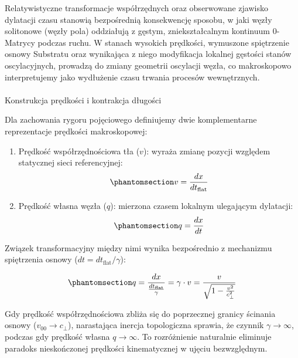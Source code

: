 \documentclass[
  polish,
  letterpaper,
  DIV=11,
  numbers=noendperiod,
  oneside]{scrartcl}
\makeatletter
\let\oldparagraph\paragraph
\renewcommand{\paragraph}{
    \@ifstar
      \xxxParagraphStar
      \xxxParagraphNoStar
  }
\newcommand{\xxxParagraphStar}[1]{\oldparagraph*{#1}\mbox{}}
\newcommand{\xxxParagraphNoStar}[1]{\oldparagraph{#1}\mbox{}}
\providecommand{\tightlist}{%
  \setlength{\itemsep}{0pt}\setlength{\parskip}{0pt}}
\makeatother
\begin{document}
Relatywistyczne transformacje współrzędnych oraz obserwowane zjawisko
dylatacji czasu stanowią bezpośrednią konsekwencję sposobu, w jaki węzły
solitonowe (węzły pola) oddziałują z gęstym, zniekształcalnym kontinuum
0-Matrycy podczas ruchu. W stanach wysokich prędkości, wymuszone
spiętrzenie osnowy Substratu oraz wynikająca z niego modyfikacja
lokalnej gęstości stanów oscylacyjnych, prowadzą do zmiany geometrii
oscylacji węzła, co makroskopowo interpretujemy jako wydłużenie czasu
trwania procesów wewnętrznych.

\paragraph{Konstrukcja prędkości i kontrakcja
długości}\label{sec-1-4-2-1}

Dla zachowania rygoru pojęciowego definiujemy dwie komplementarne
reprezentacje prędkości makroskopowej:

\begin{enumerate}
\def\labelenumi{\arabic{enumi}.}
\tightlist
\item
  Prędkość współrzędnościowa tła (\(v\)): wyraża zmianę pozycji względem
  statycznej sieci referencyjnej:
  \begin{equation}\protect\phantomsection\label{eq-1-4-3-vtla}{v = \frac{dx}{dt_{\text{flat}}}}\end{equation}
\item
  Prędkość własna węzła (\(q\)): mierzona czasem lokalnym ulegającym
  dylatacji:
  \begin{equation}\protect\phantomsection\label{eq-1-4-3-vwezla}{q = \frac{dx}{dt}}\end{equation}
\end{enumerate}

Związek transformacyjny między nimi wynika bezpośrednio z mechanizmu
spiętrzenia osnowy (\(dt = dt_{\text{flat}} / \gamma\)):

\begin{equation}\protect\phantomsection\label{eq-1-4-3-wz1}{q = \frac{dx}{\frac{dt_{\text{flat}}}{\gamma}} = \gamma \cdot v = \frac{v}{\sqrt{1 - \frac{v^2}{c_{\perp}^2}}}}\end{equation}

Gdy prędkość współrzędnościowa zbliża się do poprzecznej granicy
ścinania osnowy (\(v_\text{00} \to c_{\perp}\)), narastająca inercja
topologiczna sprawia, że czynnik \(\gamma \to \infty\), podczas gdy
prędkość własna \(q \to \infty\). To rozróżnienie naturalnie eliminuje
paradoks nieskończonej prędkości kinematycznej w ujęciu bezwzględnym.
\end{document}
